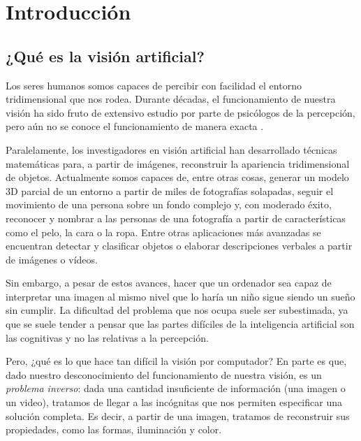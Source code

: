\section{Introducción}
\subsection{¿Qué es la visión artificial?}
Los seres humanos somos capaces de percibir con facilidad el entorno tridimensional que nos rodea. Durante décadas, el funcionamiento de nuestra visión ha sido fruto de extensivo estudio por parte de psicólogos de la percepción, pero aún no se conoce el funcionamiento de manera exacta  \cite{book:szeliski}.

Paralelamente, los investigadores en visión artificial han desarrollado técnicas matemáticas para, a partir de imágenes, reconstruir la apariencia tridimensional de objetos. Actualmente somos capaces de, entre otras cosas, generar un modelo 3D parcial de un entorno a partir de miles de fotografías solapadas, seguir el movimiento de una persona sobre un fondo complejo y, con moderado éxito, reconocer y nombrar a las personas de una fotografía a partir de características como el pelo, la cara o la ropa. Entre otras aplicaciones más avanzadas se encuentran detectar y clasificar objetos o elaborar descripciones verbales a partir de imágenes o vídeos.

Sin embargo, a pesar de estos avances, hacer que un ordenador sea capaz de interpretar una imagen al mismo nivel que lo haría un niño sigue siendo un sueño sin cumplir. La dificultad del problema que nos ocupa suele ser subestimada, ya que se suele tender a pensar que las partes difíciles de la inteligencia artificial son las cognitivas y no las relativas a la percepción. 

Pero, ¿qué es lo que hace tan difícil la visión por computador? En parte es que, dado nuestro desconocimiento del funcionamiento de nuestra visión, es un \textit{problema inverso}: dada una cantidad insuficiente de información (una imagen o un video), tratamos de llegar a las incógnitas que nos permiten especificar una solución completa. Es decir, a partir de una imagen, tratamos de reconstruir sus propiedades, como las formas, iluminación y color.

